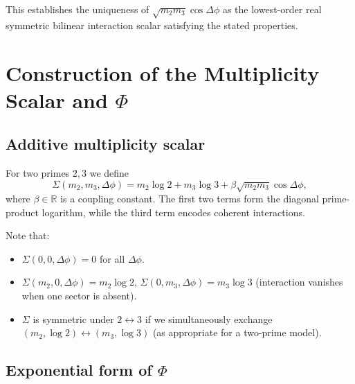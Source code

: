 \documentclass[11pt]{article}
\begin{document}
This establishes the uniqueness of \(\sqrt{m_2 m_3}\cos\Delta\phi\) as the lowest-order real symmetric bilinear interaction scalar satisfying the stated properties.

\section{Construction of the Multiplicity Scalar and \texorpdfstring{\(\Phi\)}{Phi}}

\subsection{Additive multiplicity scalar}

For two primes \(2,3\) we define
\begin{equation}
\Sigma(m_2,m_3,\Delta\phi) =
m_2 \log 2 + m_3 \log 3 + \beta \sqrt{m_2 m_3}\cos\Delta\phi,
\label{eq:sigma-appendix}
\end{equation}
where \(\beta\in\mathbb{R}\) is a coupling constant. The first two terms form the diagonal prime-product logarithm, while the third term encodes coherent interactions.

Note that:

\begin{itemize}
\item \(\Sigma(0,0,\Delta\phi) = 0\) for all \(\Delta\phi\).
\item \(\Sigma(m_2,0,\Delta\phi) = m_2\log 2\), \(\Sigma(0,m_3,\Delta\phi) = m_3\log 3\) (interaction vanishes when one sector is absent).
\item \(\Sigma\) is symmetric under \(2\leftrightarrow 3\) if we simultaneously exchange \((m_2,\log 2)\leftrightarrow (m_3,\log 3)\) (as appropriate for a two-prime model).
\end{itemize}

\subsection{Exponential form of \texorpdfstring{\(\Phi\)}{Phi}}
\end{document}
